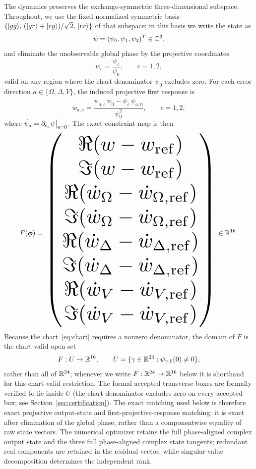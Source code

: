 The dynamics preserves the exchange-symmetric three-dimensional subspace. Throughout, we
use the fixed normalized symmetric basis
$\{\lvert gg \rangle,\,(\lvert gr \rangle+\lvert rg \rangle)/\sqrt{2},\,\lvert rr \rangle\}$ of that subspace; in this basis we
write the state as
\[
\psi=(\psi_{0},\psi_{1},\psi_{2})^{T}\in\mathbb{C}^{3},
\]
and eliminate the unobservable global phase by the projective coordinates
\begin{equation}\label{eq:chart}
w_{c}=\frac{\psi_{c}}{\psi_{0}},\qquad c=1,2,
\end{equation}
valid on any region where the chart denominator $\psi_{0}$ excludes zero. For each error
direction $a\in\{\Omega,\Delta,V\}$, the induced projective first response is
\begin{equation}\label{eq:projresp}
\dot{w}_{a,c}=\frac{\dot{\psi}_{a,c}\,\psi_{0}-\psi_{c}\,\dot{\psi}_{a,0}}{\psi_{0}^{2}},
\qquad c=1,2,
\end{equation}
where $\dot{\psi}_{a}=\partial_{\epsilon_{a}}\psi\bigr|_{\epsilon=0}$. The exact constraint map is
then
\begin{equation}\label{eq:constraintmap}
F(\boldsymbol{\phi})=
\resizebox{0.72\textwidth}{!}{$\displaystyle
\begin{pmatrix}
\Re(w-w_{\mathrm{ref}})\\
\Im(w-w_{\mathrm{ref}})\\
\Re(\dot{w}_{\Omega}-\dot{w}_{\Omega,\mathrm{ref}})\\
\Im(\dot{w}_{\Omega}-\dot{w}_{\Omega,\mathrm{ref}})\\
\Re(\dot{w}_{\Delta}-\dot{w}_{\Delta,\mathrm{ref}})\\
\Im(\dot{w}_{\Delta}-\dot{w}_{\Delta,\mathrm{ref}})\\
\Re(\dot{w}_{V}-\dot{w}_{V,\mathrm{ref}})\\
\Im(\dot{w}_{V}-\dot{w}_{V,\mathrm{ref}})
\end{pmatrix}$}
\in\Rr^{16}.
\end{equation}
Because the chart~\eqref{eq:chart} requires a nonzero denominator, the domain of $F$ is
the chart-valid open set
\[
F:U\to\mathbb{R}^{16},\qquad
U=\{\gamma\in\mathbb{R}^{24}:\psi_{\gamma,0}(0)\neq0\},
\]
rather than all of $\mathbb{R}^{24}$; whenever we write $F:\mathbb{R}^{24}\to\mathbb{R}^{16}$ below it is
shorthand for this chart-valid restriction. The formal accepted transverse boxes are
formally verified to lie inside $U$ (the chart denominator excludes zero on every accepted
box; see Section~\ref{sec:certification}). The exact matching used below is therefore
exact projective output-state and first-projective-response matching: it is exact after
elimination of the global phase, rather than a componentwise equality of raw state
vectors. The numerical optimizer retains
the full phase-aligned complex output state and the three full phase-aligned complex state
tangents; redundant real components are retained in the residual vector, while
singular-value decomposition determines the independent rank.

